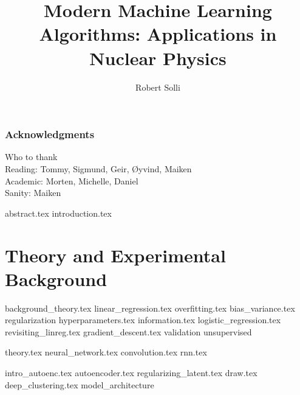 \documentclass[12pt]{uiofysmaster}
\author{Robert Solli}
\title{Modern Machine Learning Algorithms: Applications in Nuclear Physics}
\begin{document}
\maketitle

\tableofcontents
\listoffigures
\listoftodos

\newpage
\section*{Acknowledgments}
Who to thank \\
Reading: Tommy, Sigmund, Geir, Øyvind, Maiken \\
Academic: Morten, Michelle, Daniel \\
Sanity: Maiken \\
\newpage

{abstract.tex}
{introduction.tex}

\part{Theory and Experimental Background}\label{part:theory_experiment}

{background_theory.tex}
{linear_regression.tex}
{overfitting.tex}
{bias_variance.tex}
{regularization}
{hyperparameters.tex}
{information.tex}
{logistic_regression.tex}
{revisiting_linreg.tex}
{gradient_descent.tex}
{validation}
{unsupervised}

{theory.tex}
{neural_network.tex}
{convolution.tex}
{rnn.tex}

{intro_autoenc.tex}
{autoencoder.tex}
{regularizing_latent.tex}
{draw.tex}
{deep_clustering.tex}
{model_architecture}
\end{document}
